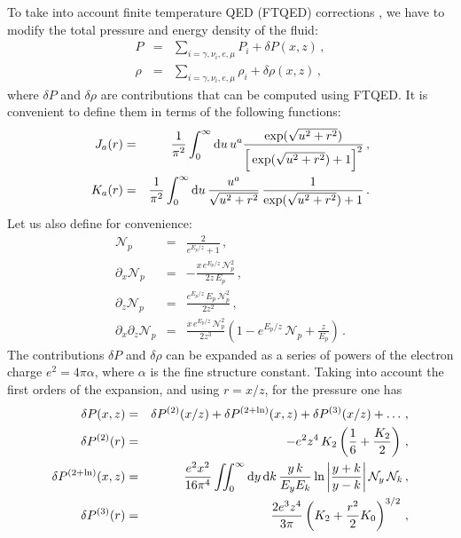 \documentclass[notitlepage,showpacs,preprintnumbers,amsmath,amssymb,superscriptaddress,prd,onecolumn]{revtex4-1}
\begin{document}
To take into account finite temperature QED (FTQED) corrections
\cite{Fornengo:1997wa,Mangano:2001iu,Bennett:2019ewm},
we have to modify the total pressure and energy density of the fluid:
\begin{eqnarray}
P
&=&
\sum_{i=\gamma,{\nu_i},e,\mu}P_i
+
\delta P(x,z)
\,,\\
\rho
&=&
\sum_{i=\gamma,{\nu_i},e,\mu}\rho_i
+
\delta\rho(x,z)
\,,
\end{eqnarray}
where $\delta P$ and $\delta\rho$ are contributions that can be computed using FTQED.
It is convenient to define them
in terms of the following functions:
\begin{eqnarray}
J_a(r)
&=&
\frac{1}{\pi^2}
\int_0^\infty {\rm d}u \, u^a
\frac{\exp(\sqrt{u^2+r^2})}{\Big[\exp(\sqrt{u^2+r^2})+1\Big]^2}
\label{eq:j}
\,,\\
K_a(r)
&=&
\frac{1}{\pi^2}
\int_0^\infty {\rm d}u \, 
\frac{u^a}{\sqrt{u^2+r^2}}\,
\frac{1}{\exp(\sqrt{u^2+r^2})+1}
\label{eq:k}\,.
\end{eqnarray}
Let us also define for convenience:
\begin{eqnarray}
\mathcal{N}_p
&=&
\frac{2}{e^{E_p/z}+1}
\,,\\
\partial_x\mathcal{N}_p
&=&
-\frac{x\,e^{E_p/z}\,\mathcal{N}_p^2}{2z\,E_p}
\,,\\
\partial_z\mathcal{N}_p
&=&
\frac{
 e^{E_p/z}\,
 E_p\,
 \mathcal{N}_p^2
}{2 z^2}
\,,\\
\partial_x\partial_z\mathcal{N}_p
&=&
\frac{
 x\,
 e^{E_p/z}\,
 \mathcal{N}_p^2
}{2z^3}
\left(
 1
 -e^{E_p/z}\,\mathcal{N}_p
 +\frac{z}{E_p}
\right)
\,.
\end{eqnarray}
The contributions $\delta P$ and $\delta\rho$ can be expanded as a series of powers of the electron charge
$e^2=4\pi\alpha$, where $\alpha$ is the fine structure constant.
Taking into account the first orders of the expansion, and using $r=x/z$, for the pressure one has \cite{Bennett:2019ewm}
%
\begin{eqnarray}
\delta P(x,z)
&=&
\delta P^{(2)}(x/z)
+
\delta P^{(2+\ln)}(x,z)
+
\delta P^{(3)}(x/z)
+\ldots
\,,
\\
\delta P^{(2)}(r)
&=&
-
e^2 z^4\,K_2
\left(
 \frac{1}{6}
 +\frac{K_2}{2}
\right)
\,,\\
\delta P^{(2+\ln)}(x,z)
&=&
\frac{e^2 x^2}{16\pi^4}
\int\!\!\!\int_0^\infty
{\rm d}y\,
{\rm d}k\,
\frac{y\,k}{E_y E_k}
\ln
\left|
\frac{y+k}{y-k}
\right|
\mathcal{N}_y\,
\mathcal{N}_k
\,,\\
\delta P^{(3)}(r)
&=&
\frac{2e^3z^4}{3\pi}
\left(
K_2
+
\frac{r^2}{2} K_0
\right)^{3/2}
\,,
\end{eqnarray}
\end{document}
